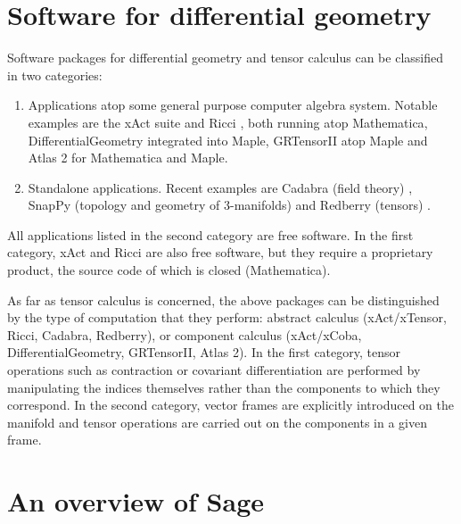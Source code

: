 \documentclass[a4paper]{jpconf}
\newcommand{\soft}[1]{\textsf{#1}}
\begin{document}

\section{Software for differential geometry}

Software packages for differential geometry and tensor calculus can be 
classified in two categories: 
\begin{enumerate}
\item Applications atop some general purpose computer algebra system. 
Notable examples are 
the \soft{xAct} suite \cite{Marti08} and \soft{Ricci} \cite{Ricci}, both
running atop \soft{Mathematica},
\soft{DifferentialGeometry} \cite{AnderT12} integrated into \soft{Maple},
\soft{GRTensorII} \cite{GRTensorII} atop \soft{Maple} and \soft{Atlas 2}
\cite{Atlas2} for \soft{Mathematica} and \soft{Maple}.
\item Standalone applications. Recent examples are \soft{Cadabra}  (field theory) \cite{Peete07},
\soft{SnapPy} (topology and geometry of 3-manifolds) \cite{SnapPy} and
\soft{Redberry} (tensors) \cite{BolotP13}.
\end{enumerate}
All applications listed in the second category are free software. In
the first category, \soft{xAct} and \soft{Ricci} are also free software, but
they require a proprietary product, the source code of which is closed (\soft{Mathematica}).

As far as tensor calculus is concerned, the above packages can be distinguished by 
the type of computation that they perform:
abstract calculus (\soft{xAct/xTensor}, \soft{Ricci}, \soft{Cadabra}, \soft{Redberry}),
or component calculus (\soft{xAct/xCoba}, \soft{DifferentialGeometry}, \soft{GRTensorII},
\soft{Atlas 2}). 
In the first category, tensor operations such as contraction or covariant differentiation 
are performed by manipulating the indices themselves rather than the components 
to which they correspond. In the second category, vector frames are explicitly 
introduced on the manifold and tensor operations are carried out on the components 
in a given frame.



\section{An overview of Sage}
\end{document}
